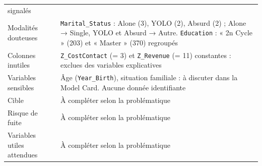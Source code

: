 \documentclass[
  12pt,
]{article}
\begin{document}
{\begin{longtable}[]{@{}
  >{\raggedright\arraybackslash}p{}
  >{\raggedright\arraybackslash}p{}@{}}
signalés \\
Modalités douteuses & \texttt{Marital\_Status} : Alone (3), YOLO (2),
Absurd (2) ; Alone → Single, YOLO et Absurd → Autre. \texttt{Education}
: « 2n Cycle » (203) et « Master » (370) regroupés \\
Colonnes inutiles & \texttt{Z\_CostContact} (= 3) et \texttt{Z\_Revenue}
(= 11) constantes : exclues des variables explicatives \\
Variables sensibles & Âge (\texttt{Year\_Birth}), situation familiale :
à discuter dans la Model Card. Aucune donnée identifiante \\
Cible & À compléter selon la problématique \\
Risque de fuite & À compléter selon la problématique \\
Variables utiles attendues & À compléter selon la problématique \\
\end{longtable}
}
\end{document}
